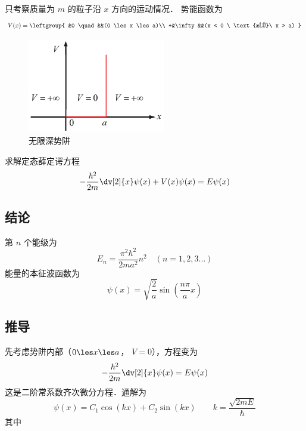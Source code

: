 

只考察质量为 $m$ 的粒子沿 $x$ 方向的运动情况．%
势能函数为
\begin{equation}
V(x) = \leftgroup{
&0 \quad &&(0 \les x \les a)\\
+&\infty  &&(x < 0 \ \text{或}\  x > a)
}\end{equation}

\begin{figure}[ht]
\centering
\includegraphics[width=6cm]{./figures/ISW1.pdf}
\caption{无限深势阱} \label{ISW_fig1}
\end{figure}
求解定态薛定谔方程 %
\begin{equation}
-\frac{\hbar ^2}{2m} \dv[2]{x} \psi(x) + V(x)\psi(x) = E\psi(x)
\end{equation} 
\subsection{结论} 

第 $n$ 个能级为
\begin{equation}
E_n = \frac{\pi^2 \hbar^2}{2m a^2} n^2 \quad (n = 1,2,3...)
\end{equation}
能量的本征波函数为
\begin{equation}
\psi(x) = \sqrt{\frac{2}{a}} \sin(\frac{n\pi }{a} x)
\end{equation}

\subsection{推导} 
先考虑势阱内部（$0 \les x \les a$， $V = 0$），方程变为
\begin{equation}
-\frac{\hbar^2}{2m} \dv[2]{x} \psi(x) = E\psi(x) 
\end{equation}
这是二阶常系数齐次微分方程．通解为
\begin{equation}
\psi(x) = C_1\cos(kx) + C_2 \sin(kx) \qquad
k = \frac{\sqrt{2mE}}{\hbar}
\end{equation} 
其中

